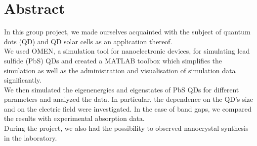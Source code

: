 \chapter*{Abstract}

In this group project, we made ourselves acquainted with the subject of quantum dots (QD) and QD solar cells as an application thereof. \\

We used OMEN, a simulation tool for nanoelectronic devices, for simulating lead sulfide (PbS) QDs and created a MATLAB toolbox which
simplifies the simulation as well as the administration and visualisation of simulation data significantly.\\

We then simulated the eigenenergies and eigenstates of PbS QDs for different parameters and analyzed the data. In particular,
the dependence on the QD's size and on the electric field were investigated. In the case of band gaps, we compared the results
with experimental absorption data.\\

During the project, we also had the possibility to observed nanocrystal synthesis in the laboratory.